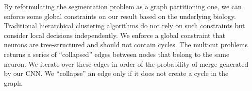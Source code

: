By reformulating the segmentation problem as a graph partitioning one, we can enforce some global constraints on our result based on the underlying biology.
Traditional hierarchical clustering algorithms do not rely on such constraints but consider local decisions independently.
We enforce a global constraint that neurons are tree-structured and should not contain cycles. 
The multicut problems returns a series of ``collapsed'' edges between nodes that belong to the same neuron.
We iterate over these edges in order of the probability of merge generated by our CNN. 
We ``collapse'' an edge only if it does not create a cycle in the graph.
